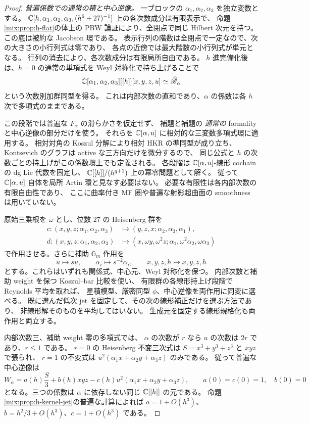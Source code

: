 \begin{proof}
\emph{普遍係数での通常の積と中心逆像。}
一ブロックの $\alpha_1,\alpha_2,\alpha_3$ を独立変数とする。
$\mathbb C[h,\alpha_1,\alpha_2,\alpha_3,(h^6+27)^{-1}]$ 上の各次数成分は有限表示で、
命題\ref{mix:prop:h-flat}の体上の PBW 論証により、全閉点で同じ Hilbert 次元を持つ。
この底は被約な Jacobson 環である。
表示行列の階数は全閉点で一定なので、次の大きさの小行列式は零であり、
各点の近傍では最大階数の小行列式が単元となる。
行列の消去により、各次数成分は有限局所自由である。
$h$ 進完備化後は、$h=0$ の通常の単項式を Weyl 対称化で持ち上げることで
\[
 \mathbb C[\alpha_1,\alpha_2,\alpha_3][[h]][x,y,z,u]
 \simeq\widehat{\mathscr B}_{\alpha}
\]
という次数別加群同型を得る。
これは内部次数の直和であり、$\alpha$ の係数は各 $h$ 次で多項式のままである。

この段階では普遍な $F_\alpha$ の滑らかさを仮定せず、
補題と補題の
\emph{通常の} formality と中心逆像の部分だけを使う。
それらを $\mathbb C[\alpha,u]$ に相対的な三変数多項式環に適用する。
相対対角の Koszul 分解により相対 HKR の準同型が成り立ち、
Kontsevich のグラフは active な三方向だけを微分するので、
同じ公式と $h$ の次数ごとの持上げがこの係数環上でも定義される。
各段階は $\mathbb C[\alpha,u]$-線形 cochain の dg Lie 代数を固定し、
$\mathbb C[[h]]/(h^{q+1})$ 上の冪零問題として解く。
従って $\mathbb C[\alpha,u]$ 自体を局所 Artin 環と見なす必要はない。
必要な有限性は各内部次数の有限自由性であり、
ここに曲率付き MF 圏や普遍な射影超曲面の smoothness は用いていない。

原始三乗根を $\omega$ とし、位数 $27$ の Heisenberg 群を
\[
 \begin{aligned}
 c:(x,y,z;\alpha_1,\alpha_2,\alpha_3)
   &\longmapsto(y,z,x;\alpha_2,\alpha_3,\alpha_1),\\
 d:(x,y,z;\alpha_1,\alpha_2,\alpha_3)
   &\longmapsto(x,\omega y,\omega^2z;
                 \alpha_1,\omega^2\alpha_2,\omega\alpha_3)
 \end{aligned}
\]
で作用させる。さらに補助 $\mathbb G_m$ 作用を
\[
 u\longmapsto s u,\qquad \alpha_i\longmapsto s^{-2}\alpha_i,
 \qquad x,y,z,h\longmapsto x,y,z,h
\]
とする。これらはいずれも関係式、中心元、Weyl 対称化を保つ。
内部次数と補助 weight を保つ Koszul--bar 比較を使い、
有限群の各線形持上げ段階で Reynolds 平均を取れば、
星積模型、厳密同型 $\phi$、中心逆像を両作用に同変に選べる。
既に選んだ低次 jet を固定して、その次の線形補正だけを選ぶ方法であり、
非線形解そのものを平均してはいない。
生成元を固定する線形規格化も両作用と両立する。

内部次数三、補助 weight 零の多項式では、
$\alpha$ の次数が $r$ なら $u$ の次数は $2r$ であり、$r\le1$ である。
$r=0$ の Heisenberg 不変三次式は $S=x^3+y^3+z^3$ と $xyz$ で張られ、
$r=1$ の不変式は $u^2(\alpha_1x+\alpha_2y+\alpha_3z)$ のみである。
従って普遍な中心逆像は
\begin{equation}\label{mix:eq:h-universal-three-coefficients}
 W_\alpha=a(h)\frac S3+b(h)xyz
           -c(h)u^2(\alpha_1x+\alpha_2y+\alpha_3z),
 \qquad a(0)=c(0)=1,\quad b(0)=0
\end{equation}
となる。三つの係数は $\alpha$ に依存しない同じ $\mathbb C[[h]]$ の元である。
命題\ref{mix:prop:h-kernel-jet}の普遍な計算によれば
$a=1+O(h^3)$、$b=h^2/3+O(h^3)$、$c=1+O(h^3)$ である。


\end{proof}

